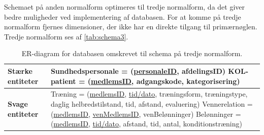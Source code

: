 \noindent
Schemaet på anden normalform optimeres til tredje normalform, da det giver bedre muligheder ved implementering af databasen. For at komme på tredje normalform fjernes dimensioner, der ikke har en direkte tilgang til primærnøglen. Tredje normalform ses af \autoref{tab:schema3}.


\begin{table} [H]
	\centering
  \begin{tabular}{ | l | p{12cm} |} \hline
     \textbf{Stærke entiteter} & Sundhedspersonale = (\underline{personaleID}, afdelingsID)
\newline KOL-patient = (\underline{medlemsID}, adgangskode, kategorisering) \\ \hline
 	\textbf{Svage entiteter} & Træning = (\underline{medlemsID}, \underline{tid/dato}, træningsform, træningstype, daglig helbredstilstand, tid, afstand, evaluering)
 \newline Vennerelation = (\underline{medlemsID}, \underline{venMedlemsID},  venBelønninger)
\newline Belønninger = (\underline{medlemsID}, \underline{tid/dato}, afstand, tid, antal, konditionstræning)\\ \hline
    \end{tabular}
    \caption{ER-diagram for databasen omskrevet til schema på tredje normalform.}
    \label{tab:schema3}
\end{table}





